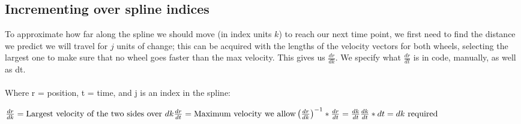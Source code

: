 \documentclass[12pt, english]{article}
\begin{document}
\subsection{Incrementing over spline indices}
To approximate how far along the spline we should move (in index units $k$) to reach our next time point, we first need to find the distance we predict we will travel for $j$ units of change; this can be acquired with the lengths of the velocity vectors for both wheels, selecting the largest one to make sure that no wheel goes faster than the max velocity. This gives us $\frac{dr}{dk}$. We specify what $\frac{dr}{dt}$ is in code, manually, as well as dt. \\
\\
\noindent
Where r = position, t = time, and j is an index in the spline:

\noindent
\begin{math}
	\frac{dr}{dk} = 
	\text{Largest velocity of the two sides over } dk\\
	\\
	\frac{dr}{dt} = \text{Maximum velocity we allow} \\
	\\
	\left(\frac{dr}{dk}\right)^{-1} * \frac{dr}{dt} = \frac{dk}{dt} \\
	\\
	\frac{dk}{dt} * dt = dk \text{ required}
\end{math}
\end{document}
